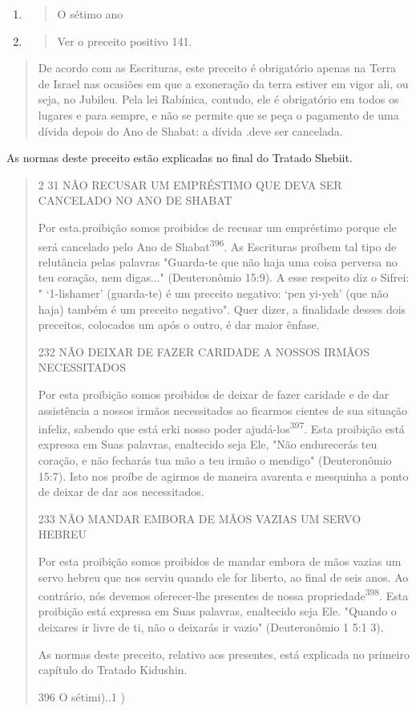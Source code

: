 \begin{enumerate}
\def\labelenumi{\arabic{enumi}.}
\setcounter{enumi}{393}
\item
  \begin{quote}
  O sétimo ano
  \end{quote}
\item
  \begin{quote}
  Ver o preceito positivo 141.
  \end{quote}
\end{enumerate}

\begin{quote}
De acordo com as Escrituras, este preceito é obrigatório apenas na Terra
de Israel nas ocasiões em que a exoneração da terra estiver em vigor
ali, ou seja, no Jubileu. Pela lei Rabínica, contudo, ele é obrigatório
em todos os lugares e para sempre, e não se permite que se peça o
pagamento de uma dívi­da depois do Ano de Shabat: a dívida .deve ser
cancelada.
\end{quote}

As normas deste preceito estão explicadas no final do Tratado Shebiit.

\begin{quote}
2 31 NÃO RECUSAR UM EMPRÉSTIMO QUE DEVA SER CANCELADO NO ANO DE SHABAT

Por esta.proibição somos proibidos de recusar um empréstimo por­que ele
será cancelado pelo Ano de Shabat\textsuperscript{396}. As Escrituras
proíbem tal tipo de relutância pelas palavras "Guarda-te que não haja
uma coisa perversa no teu coração, nem digas..." (Deuteronômio 15:9). A
esse respeito diz o Sifrei: " `1-lis­hamer' (guarda-te) é um preceito
negativo: `pen yi-yeh' (que não haja) também é um preceito negativo".
Quer dizer, a finalidade desses dois preceitos, coloca­dos um após o
outro, é dar maior ênfase.

232 NÃO DEIXAR DE FAZER CARIDADE A NOSSOS IRMÃOS NECESSITADOS

Por esta proibição somos proibidos de deixar de fazer caridade e de dar
assistência a nossos irmãos necessitados ao ficarmos cientes de sua
situação infeliz, sabendo que está erki nosso poder
ajudá-los\textsuperscript{397}. Esta proibição está ex­pressa em Suas
palavras, enaltecido seja Ele, "Não endurecerás teu coração, e não
fecharás tua mão a teu irmão o mendigo" (Deuteronômio 15:7). Isto nos
proíbe de agirmos de maneira avarenta e mesquinha a ponto de deixar de
dar aos necessitados.

233 NÃO MANDAR EMBORA DE MÃOS VAZIAS UM SERVO HEBREU

Por esta proibição somos proibidos de mandar embora de mãos va­zias um
servo hebreu que nos serviu quando ele for liberto, ao final de seis
anos. Ao contrário, nós devemos oferecer-lhe presentes de nossa
propriedade\textsuperscript{398}. Es­ta proibição está expressa em Suas
palavras, enaltecido seja Ele. "Quando o dei­xares ir livre de ti, não o
deixarás ir vazio" (Deuteronômio 1 5:1 3).

As normas deste preceito, relativo aos presentes, está explicada no
primeiro capítulo do Tratado Kidushin.

396 O sétimi)..1 )
\end{quote}

